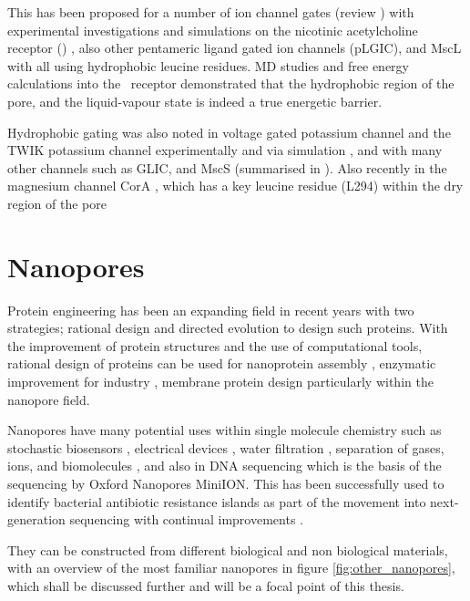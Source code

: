 This has been proposed for a number of ion channel gates (review \cite{Aryal2014i,Trick2015}) with experimental investigations and simulations on the nicotinic acetylcholine receptor (\na) \cite{Miyazawa2003,Beckstein2006b,Corry2006}, also other pentameric ligand gated ion channels (pLGIC), \cite{Cheng2009,Zhu2012,Zhu2012g} and MscL \cite{Blount1999a,Beckstein2004c,Yoshimura1999,Anishkin2010,Birkner2012} with all using hydrophobic leucine residues. MD studies and free energy calculations into the \na\ receptor \cite{Beckstein2006b} demonstrated that the hydrophobic region of the pore, and the liquid-vapour state is indeed a true energetic barrier. 

Hydrophobic gating was also noted in voltage gated potassium channel \cite{Jensen2010,Jensen2012} and the TWIK potassium channel experimentally and via simulation \cite{Aryal2014g},  and with many other channels such as GLIC, and MscS (summarised in \cite{Aryal2014i}). Also recently in the magnesium channel CorA \cite{Neale2015}, which has a key leucine residue (L294) within the dry region of the pore


\section{Nanopores}

Protein engineering has been an expanding field in recent years with two strategies; rational design and directed evolution to design such proteins. With the improvement of protein structures and the use of computational tools, rational design of proteins can be used for nanoprotein assembly \cite{Ardejani2011}, enzymatic improvement for industry \cite{Singh2013}, membrane protein design \cite{Perez-Aguilar2012} particularly within the nanopore field. 

Nanopores have many potential uses within single molecule chemistry \citep{Bayley2008x} such as stochastic biosensors \cite{Braha1997a,Bayley2001}, electrical devices \cite{Lee2010a,Hilder2012}, water filtration \cite{Holt2006,Majumder2011a,Corry2008,Kosa2012}, separation of gases, ions, and biomolecules \cite{Lee2013e,Park2006,Diao2012}, and also in DNA sequencing \cite{Cherf2012,Manrao2012,Pennisi2012} which is the basis of the sequencing by Oxford Nanopores MiniION. This has been successfully used to identify bacterial antibiotic resistance islands \cite{Ashton2015} as part of the movement into next-generation sequencing with continual improvements \cite{Jain2015}. 

They can be constructed from different biological and non biological materials, with an overview of the most familiar nanopores in figure \ref{fig:other_nanopores}, which shall be discussed further and will be a focal point of this thesis. 

